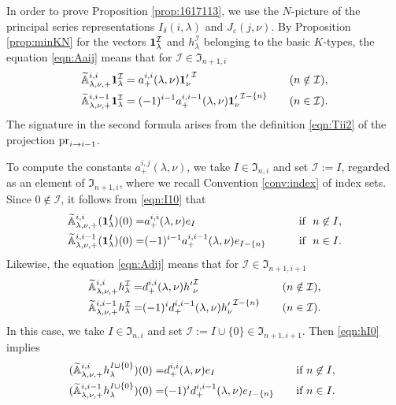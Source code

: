 In order to prove Proposition \ref{prop:1617113}, 
 we use the $N$-picture of the principal series representations
 $I_{\delta}(i,\lambda)$ and $J_{\varepsilon}(j,\nu)$.  
By Proposition \ref{prop:minKN}
 for the vectors ${\bf{1}}_{\lambda}^{\mathcal{I}}$
 and $h_{\lambda}^{\mathcal{I}}$ belonging to the basic $K$-types,
 the equation \eqref{eqn:Aaij} means
 that for ${\mathcal{I}} \in {\mathfrak{I}}_{n+1,i}$
\begin{alignat*}{2}
\Atbb \lambda \nu {+} {i,i} {\bf{1}}_{\lambda}^{\mathcal{I}}
&=
a_+^{i,i}(\lambda,\nu) {{\bf{1}}_{\nu}'}^{{\mathcal{I}}}
\hphantom{(-1)^{i-}mii}
\quad
&&(n \notin {\mathcal{I}}), 
\\
\Atbb \lambda \nu {+} {i,i-1}
{\bf{1}}_{\lambda}^{\mathcal{I}}
&=
(-1)^{i-1} a_+^{i,i-1}(\lambda,\nu) {{\bf{1}}_{\nu}'}^{\mathcal{I}\setminus \{n\}}
\quad
&&(n\in {\mathcal{I}}).  
\end{alignat*}
The signature in the second formula
 arises from the definition \eqref{eqn:Tii2}
 of the projection $\operatorname{pr}_{{i}\to{i-1}}$.  



To compute the constants $a_+^{i,j}(\lambda,\nu)$, 
 we take $I \in {\mathfrak {I}}_{n, i}$
 and set ${\mathcal{I}}:=I$, 
 regarded as an element of ${\mathfrak {I}}_{n+1, i}$, 
 where we recall Convention \ref{conv:index} of index sets.  
Since $0 \not \in {\mathcal{I}}$, 
 it follows from \eqref{eqn:I10} that 
\begin{alignat*}{2}
{\widetilde{\mathbb{A}}}_{{\lambda},{\nu},{+}}^{{i,i}}
 ({\bf{1}}_{\lambda}^{I})(0)
 =&
 a_+^{i,i}(\lambda,\nu) e_{I}
\qquad
&&\text{if }\,\,
 n \not \in I, 
\\
{\widetilde{\mathbb{A}}}_{{\lambda},{\nu},{+}}^{{i,i-1}}
 ({\bf{1}}_{\lambda}^{I})(0)
 =& 
 (-1)^{i-1} a_+^{i,i-1}(\lambda,\nu) e_{I - \{n\}}
 \qquad
&&\text{if }\,\,
 n \in I.   
\end{alignat*}
Likewise, 
 the equation \eqref{eqn:Adij} means 
that
for ${\mathcal{I}} \in {\mathfrak{I}}_{n+1,i+1}$
\begin{alignat*}{2}
{\widetilde{\mathbb{A}}}_{{\lambda},{\nu},{+}}^{{i,i}} h_{\lambda}^{\mathcal{I}}
=&
d_+^{i,i}(\lambda,\nu) {h'}_{\nu}^{{\mathcal{I}}}
\qquad\qquad\qquad
&&(n \notin {\mathcal{I}}), 
\\
{\widetilde{\mathbb{A}}}_{{\lambda},{\nu},{+}}^{{i,i-1}}
h_{\lambda}^{\mathcal{I}}
=&(-1)^i d_+^{i,i-1}(\lambda,\nu) {h_{\nu}'}^{\mathcal{I}-\{n\}}
\quad
&&(n\in {\mathcal{I}}).  
\end{alignat*}
In this case, 
 we take $I \in {\mathfrak{I}}_{n,i}$
 and set ${\mathcal{I}}:=I \cup \{0\} \in {\mathfrak {I}}_{n+1, i+1}$.  
Then \eqref{eqn:hI0} implies 
\begin{alignat}{2}
\label{eqn:CApm-5}
({\widetilde{\mathbb{A}}}_{{\lambda},{\nu},{+}}^{{i,i}} h_{\lambda}^{I \cup \{0\}})(0)
=&
d_+^{i,i}(\lambda,\nu) e_I
\quad
&&\text{if $n \not \in I$}, 
\\
({\widetilde{\mathbb{A}}}_{{\lambda},{\nu},{+}}^{{i,i-1}} h_{\lambda}^{I \cup \{0\}})(0)
=&
(-1)^i d_+^{i,i-1}(\lambda,\nu) e_{I- \{n\}}
\quad
&&\text{if $n \in I$.  }
\notag
\end{alignat}



